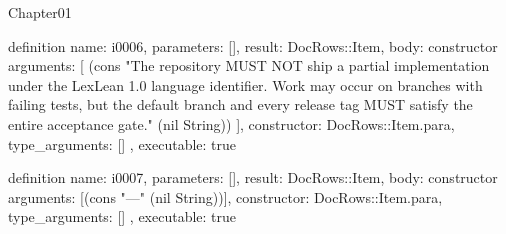 \begin{lexlean}{Chapter01}
\begin{semanticmodule}
definition{
  name: i0006,
  parameters: [],
  result: DocRows::Item,
  body: constructor{
    arguments: [
      (cons "The repository MUST NOT ship a partial implementation under the LexLean 1.0 language identifier. Work may occur on branches with failing tests, but the default branch and every release tag MUST satisfy the entire acceptance gate." (nil String))
    ],
    constructor: DocRows::Item.para,
    type_arguments: []
  },
  executable: true
}

definition{
  name: i0007,
  parameters: [],
  result: DocRows::Item,
  body: constructor{
    arguments: [(cons "---" (nil String))],
    constructor: DocRows::Item.para,
    type_arguments: []
  },
  executable: true
}
\end{semanticmodule}
\end{lexlean}
